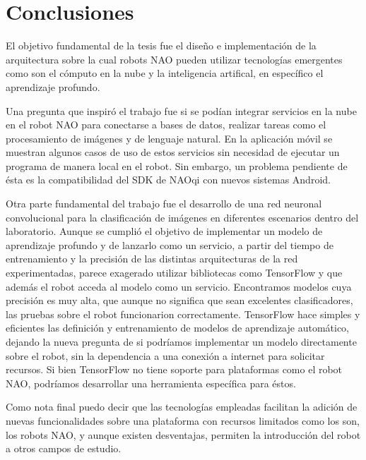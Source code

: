 \chapter*{Conclusiones}
\label{\detokenize{conclusion:cloudnao-una-arquitectura-de-software-para-la-integracion-de-computo-en-la-nube-con-robots-nao}}\label{\detokenize{conclusion:conclusion}}\label{\detokenize{conclusion::doc}}


El objetivo fundamental de la tesis fue el diseño e implementación de
la arquitectura sobre la cual robots NAO pueden
utilizar tecnologías emergentes como son el cómputo en la nube y
la inteligencia artifical, en específico el aprendizaje profundo.

Una pregunta que inspiró el trabajo
fue si se podían integrar servicios en la nube
en el robot NAO para conectarse a bases de datos, realizar tareas como el procesamiento de imágenes y de lenguaje natural. En la aplicación
móvil se muestran algunos casos de uso de estos servicios
sin necesidad de ejecutar un programa de manera local
en el robot. Sin embargo, un problema pendiente de ésta
es la compatibilidad del SDK de NAOqi con nuevos sistemas
Android.

Otra parte fundamental del trabajo fue el desarrollo
de una red neuronal convolucional para la clasificación
de imágenes en diferentes escenarios dentro del laboratorio.
Aunque se cumplió el objetivo de implementar un modelo
de aprendizaje profundo y de lanzarlo como un servicio, 
a partir del tiempo de entrenamiento y la precisión de las
distintas arquitecturas de la red experimentadas,
parece exagerado utilizar bibliotecas como TensorFlow 
y que además el robot acceda al modelo como
un servicio.
Encontramos modelos
cuya precisión es muy alta, que aunque no significa que sean excelentes clasificadores,
las pruebas sobre el robot funcionarion correctamente.
TensorFlow hace simples y eficientes
las definición y entrenamiento de modelos de aprendizaje automático,
dejando la nueva pregunta de si podríamos implementar un modelo 
directamente sobre el robot, sin la dependencia a una conexión
a internet para solicitar recursos. Si bien TensorFlow
no tiene soporte para plataformas como el robot NAO, podríamos
desarrollar una herramienta específica para éstos. 

Como nota final puedo decir que las tecnologías empleadas
facilitan la adición
de nuevas funcionalidades sobre una plataforma con recursos
limitados como los son, los robots NAO, y aunque existen desventajas,
permiten la introducción
del robot a otros campos de estudio.